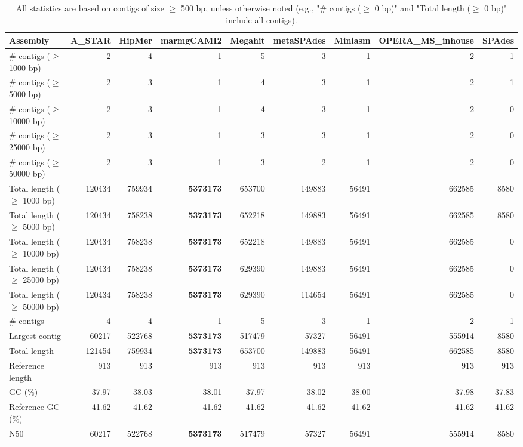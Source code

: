 \documentclass[12pt,a4paper]{article}
\begin{document}
\begin{table}[ht]
\begin{center}
\caption{All statistics are based on contigs of size $\geq$ 500 bp, unless otherwise noted (e.g., "\# contigs ($\geq$ 0 bp)" and "Total length ($\geq$ 0 bp)" include all contigs).}
\begin{tabular}{|l*{8}{|r}|}
\hline
Assembly & A\_STAR & HipMer & marmgCAMI2 & Megahit & metaSPAdes & Miniasm & OPERA\_MS\_inhouse & SPAdes \\ \hline
\# contigs ($\geq$ 1000 bp) & 2 & 4 & 1 & 5 & 3 & 1 & 2 & 1 \\ \hline
\# contigs ($\geq$ 5000 bp) & 2 & 3 & 1 & 4 & 3 & 1 & 2 & 1 \\ \hline
\# contigs ($\geq$ 10000 bp) & 2 & 3 & 1 & 4 & 3 & 1 & 2 & 0 \\ \hline
\# contigs ($\geq$ 25000 bp) & 2 & 3 & 1 & 3 & 3 & 1 & 2 & 0 \\ \hline
\# contigs ($\geq$ 50000 bp) & 2 & 3 & 1 & 3 & 2 & 1 & 2 & 0 \\ \hline
Total length ($\geq$ 1000 bp) & 120434 & 759934 & {\bf 5373173} & 653700 & 149883 & 56491 & 662585 & 8580 \\ \hline
Total length ($\geq$ 5000 bp) & 120434 & 758238 & {\bf 5373173} & 652218 & 149883 & 56491 & 662585 & 8580 \\ \hline
Total length ($\geq$ 10000 bp) & 120434 & 758238 & {\bf 5373173} & 652218 & 149883 & 56491 & 662585 & 0 \\ \hline
Total length ($\geq$ 25000 bp) & 120434 & 758238 & {\bf 5373173} & 629390 & 149883 & 56491 & 662585 & 0 \\ \hline
Total length ($\geq$ 50000 bp) & 120434 & 758238 & {\bf 5373173} & 629390 & 114654 & 56491 & 662585 & 0 \\ \hline
\# contigs & 4 & 4 & 1 & 5 & 3 & 1 & 2 & 1 \\ \hline
Largest contig & 60217 & 522768 & {\bf 5373173} & 517479 & 57327 & 56491 & 555914 & 8580 \\ \hline
Total length & 121454 & 759934 & {\bf 5373173} & 653700 & 149883 & 56491 & 662585 & 8580 \\ \hline
Reference length & 913 & 913 & 913 & 913 & 913 & 913 & 913 & 913 \\ \hline
GC (\%) & 37.97 & 38.03 & 38.01 & 37.97 & 38.02 & 38.00 & 37.98 & 37.83 \\ \hline
Reference GC (\%) & 41.62 & 41.62 & 41.62 & 41.62 & 41.62 & 41.62 & 41.62 & 41.62 \\ \hline
N50 & 60217 & 522768 & {\bf 5373173} & 517479 & 57327 & 56491 & 555914 & 8580 \\ \hline

\end{tabular}
\end{center}
\end{table}
\end{document}
